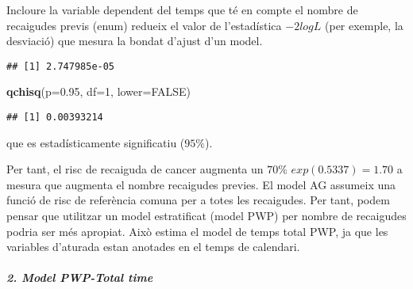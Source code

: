 \documentclass[
]{article}
\newenvironment{Shaded}{\begin{snugshade}}{\end{snugshade}}
\newcommand{\AttributeTok}[1]{\textcolor[rgb]{0.13,0.29,0.53}{#1}}
\newcommand{\ConstantTok}[1]{\textcolor[rgb]{0.56,0.35,0.01}{#1}}
\newcommand{\DecValTok}[1]{\textcolor[rgb]{0.00,0.00,0.81}{#1}}
\newcommand{\FloatTok}[1]{\textcolor[rgb]{0.00,0.00,0.81}{#1}}
\newcommand{\FunctionTok}[1]{\textcolor[rgb]{0.13,0.29,0.53}{\textbf{#1}}}
\newcommand{\NormalTok}[1]{#1}
\newcommand{\OtherTok}[1]{\textcolor[rgb]{0.56,0.35,0.01}{#1}}
\newcommand{\SpecialCharTok}[1]{\textcolor[rgb]{0.81,0.36,0.00}{\textbf{#1}}}
\begin{document}
Incloure la variable dependent del temps que té en compte el nombre de
recaigudes previs (enum) redueix el valor de l'estadística \(−2logL\)
(per exemple, la desviació) que mesura la bondat d'ajust d'un model.

\begin{Shaded}
\end{Shaded}

\begin{verbatim}
## [1] 2.747985e-05
\end{verbatim}

\begin{Shaded}
\begin{Highlighting}[]
\FunctionTok{qchisq}\NormalTok{(}\AttributeTok{p=}\FloatTok{0.95}\NormalTok{, }\AttributeTok{df=}\DecValTok{1}\NormalTok{, }\AttributeTok{lower=}\ConstantTok{FALSE}\NormalTok{)}
\end{Highlighting}
\end{Shaded}

\begin{verbatim}
## [1] 0.00393214
\end{verbatim}

que es estadísticamente significatiu (\(95\%\)).

Per tant, el risc de recaiguda de cancer augmenta un \(70\%\)
\(exp(0.5337)=1.70\) a mesura que augmenta el nombre recaigudes previes.
El model AG assumeix una funció de risc de referència comuna per a totes
les recaigudes. Per tant, podem pensar que utilitzar un model
estratificat (model PWP) per nombre de recaigudes podria ser més
apropiat. Això estima el model de temps total PWP, ja que les variables
d'aturada estan anotades en el temps de calendari.

\subparagraph{2. Model PWP-Total time}\label{model-pwp-total-time}
\end{document}

